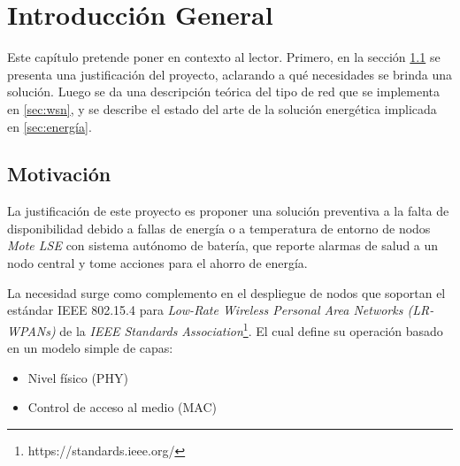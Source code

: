 
\chapter{Introducción General} %

\label{Chapter1} %
\label{IntroGeneral}


\newcommand{\keyword}[1]{\textbf{#1}}
\newcommand{\tabhead}[1]{\textbf{#1}}
\newcommand{\code}[1]{\texttt{#1}}
\newcommand{\file}[1]{\texttt{\bfseries#1}}
\newcommand{\option}[1]{\texttt{\itshape#1}}
\newcommand{\grados}{$^{\circ}$}


Este capítulo pretende poner en contexto al lector. Primero, en la sección \ref{sec:Motivación} se presenta una justificación del proyecto, aclarando a qué necesidades se brinda una solución. Luego se da una descripción teórica del tipo de red que se implementa en \ref{sec:wsn}, y se describe el estado del arte de la solución energética implicada en \ref{sec:energía}.

\section{Motivación}
\label{sec:Motivación}

La justificación de este proyecto es proponer una solución preventiva a la falta de disponibilidad debido a fallas de energía o a temperatura de entorno de nodos \textit{Mote LSE} \citep{mote} con sistema autónomo de batería, que reporte alarmas de salud a un nodo central y tome acciones para el ahorro de energía.

La necesidad surge como complemento en el despliegue de nodos que soportan el estándar IEEE 802.15.4 \citep{802154} para \textit{Low-Rate Wireless Personal Area Networks (LR-WPANs)} de la \textit{IEEE Standards Association}\footnote{https://standards.ieee.org/}. El cual define su operación basado en un modelo simple de capas:
		\begin{itemize}
			\item Nivel físico (PHY)
			\item Control de acceso al medio (MAC)
		\end{itemize}

